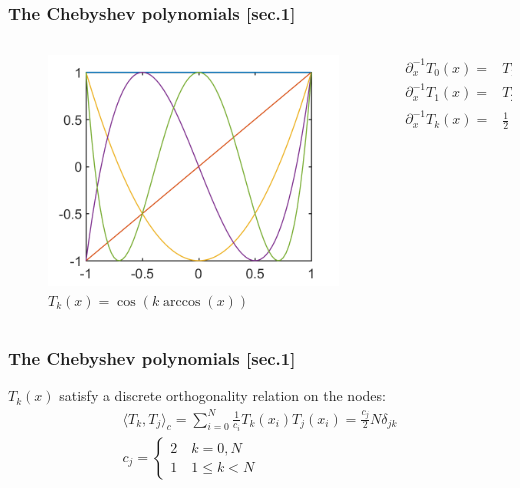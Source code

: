 \documentclass{beamer}
\begin{document}
\begin{frame}
\frametitle{The Chebyshev polynomials [sec.1]}

\begin{columns}

\begin{column}{0.4\textwidth}
\begin{figure}
\includegraphics[width=\textwidth]{ChebPoly.png}
\caption{$T_k(x) = \cos \left ( k \arccos (x) \right )$}
\end{figure}
\end{column}

\begin{column}{0.6\textwidth}
\begin{align*}
 \partial_x^{-1} T_0(x) = & T_1(x) \\
 \partial_x^{-1} T_1(x) = & T_2(x) / 4 \\
 \partial_x^{-1}T_k(x) = & \frac{1}{2} \left ( \frac{T_{k+1}(x)}{k+1} - \frac{T_{k-1}(x)}{k-1} \right ).
\end{align*}
\end{column}

\end{columns}
\end{frame}

\begin{frame}
\frametitle{The Chebyshev polynomials [sec.1]}
$T_k(x)$ satisfy a discrete orthogonality relation on the nodes:
\begin{equation*}
\begin{gathered}
\langle T_k,T_j \rangle_c = 
\sum_{i=0}^{N} \frac{1}{c_i} T_k(x_i) T_j(x_i) = \frac{c_j}{2} N \delta_{jk} \\
c_j = \begin{cases} 2 \quad k = 0, N \\ 1 \quad 1 \leq k < N \end{cases}
\end{gathered}
\end{equation*}
\end{frame}
\end{document}
